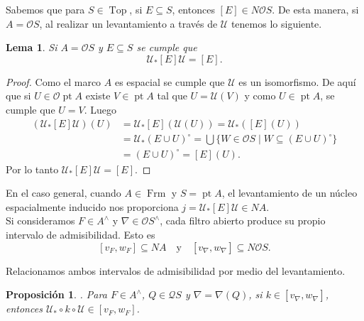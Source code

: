 \documentclass[11pt]{amsart}
\DeclareMathOperator{\pt}{pt}
\DeclareMathOperator{\Frm}{Frm}
\DeclareMathOperator{\Top}{Top}
\theoremstyle{plain}
\newtheorem{lem}[thm]{Lema}
\newtheorem{prop}[thm]{Proposición}
\theoremstyle{definition}
\begin{document}
Sabemos que para $S\in \Top$, si $E\subseteq S$, entonces $[E]\in N\mathcal{O}S$. De esta manera, si $A=\mathcal{O}S$, al realizar un levantamiento a través de $\mathcal{U}$ tenemos lo siguiente.
\begin{lem}\label{lem:auxiliar}
Si $A=\mathcal{O}S$ y $E\subseteq S$ se cumple que
\[
\mathcal{U}_*[E]\mathcal{U}=[E].
\]
\end{lem}

\begin{proof}
Como el marco $A$ es espacial se cumple que $\mathcal{U}$ es un isomorfismo. De aquí que si $U\in \mathcal{O}\pt A$ existe $V\in \pt A$ tal que $U=\mathcal{U}(V)$ y como $U\in \pt A$, se cumple que $U=V$. Luego
\[
\begin{split}
(\mathcal{U}_*[E]\mathcal{U})(U)&=\mathcal{U}_*[E](\mathcal{U}(U))=\mathcal{U}_*([E](U))\\
&=\mathcal{U}_*(E\cup U)^{\circ}=\bigcup\{W\in \mathcal{O}S\mid W\subseteq (E\cup U)^{\circ}\}\\
&=(E\cup U)^{\circ}=[E](U).
\end{split}
\]
Por lo tanto $\mathcal{U}_*[E]\mathcal{U}=[E]$.
\end{proof}

En el caso general, cuando $A\in \Frm$ y $S=\pt A$, el levantamiento de un núcleo espacialmente inducido nos proporciona $j={\mathcal{U}}_*[E]\mathcal{U}\in NA$.\\

Si consideramos $F\in A^\wedge$ y $\nabla\in \mathcal{O}S^\wedge$, cada filtro abierto produce su propio intervalo de admisibilidad. Esto es
\[
[v_F, w_F]\subseteq NA\quad\text{y}\quad[v_\nabla, w_\nabla]\subseteq N\mathcal{O}S.
\]

Relacionamos ambos intervalos de admisibilidad por medio del levantamiento.

\begin{prop}\label{morfismo} .
    Para $F\in A^\wedge$, $Q\in\mathcal{Q}S$ y $\nabla=\nabla(Q)$, si $k\in [v_\nabla, w_\nabla]$, entonces $\mathcal{U}_*\circ k\circ\mathcal{U}\in [v_F, w_F]$.
\end{prop}
\end{document}
